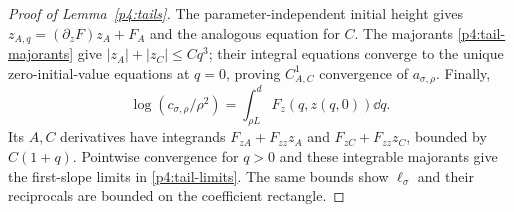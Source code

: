 \begin{proof}[Proof of Lemma~\ref{p4:tails}]
The parameter-independent initial height gives
$z_{A,q}=(\partial_zF)z_A+F_A$ and the analogous equation for $C$.
The majorants \eqref{p4:tail-majorants} give $|z_A|+|z_C|\le Cq^3$;
their integral equations converge to the unique zero-initial-value
equations at $q=0$, proving $C^1_{A,C}$ convergence of $a_{\sigma,\rho}$.
Finally,
\[
 \log(c_{\sigma,\rho}/\rho^2)=
 \int_{\rho L}^dF_z(q,z(q,0))\dd q.
\]
Its $A,C$ derivatives have integrands
$F_{zA}+F_{zz}z_A$ and $F_{zC}+F_{zz}z_C$, bounded by
$C(1+q)$.
Pointwise convergence for $q>0$ and these integrable majorants give
the first-slope limits in \eqref{p4:tail-limits}.
The same bounds show $\ell_\sigma$ and their reciprocals are bounded
on the coefficient rectangle.
\end{proof}
